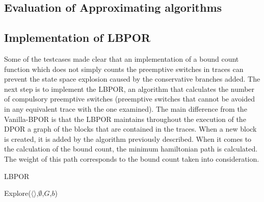 \subsection{Evaluation of Approximating algorithms}




\subsection{Implementation of LBPOR}

Some of the testcases made clear that an implementation of a bound count function which does not simply counts the preemptive switches in traces can prevent
the state space explosion caused by the conservative branches added. The next step is to implement the LBPOR, an algorithm that calculates the number of compulsory
preemptive switches (preemptive switches that cannot be avoided in any equivalent trace with the one examined). The main difference from the Vanilla-BPOR is that
the LBPOR maintains throughout the execution of the DPOR a graph of the blocks that are contained in the traces. When a new block is created, it is added by the
algorithm previously described. When it comes to the calculation of the bound count, the minimum hamiltonian path is calculated. The weight of this path corresponds
to the bound count taken into consideration.

\begin{algorithm}
    \caption{LBPOR}
    \label{LBPOR}
    Explore($\langle \rangle$,$\emptyset$,$G$,$b$)\;
\end{algorithm}


